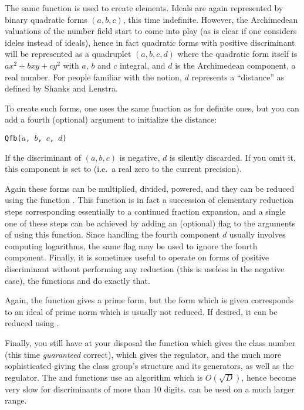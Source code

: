 The same  function is used to create elements. Ideals are again
represented by binary quadratic forms $(a,b,c)$, this time indefinite. However,
the Archimedean valuations of the number field start to come into play (as
is clear if one considers ideles instead of ideals), hence in fact quadratic
forms with positive discriminant will be represented as a quadruplet
$(a,b,c,d)$ where the quadratic form itself is $ax^2+bxy+cy^2$ with $a$,
$b$ and $c$ integral, and $d$ is the Archimedean component, a real number.
For people familiar with the notion, $d$ represents a ``distance'' as defined
by Shanks and Lenstra.

To create such forms, one uses the same function as for definite ones, but
you can add a fourth (optional) argument to initialize the distance:

\centerline{\tt Qfb($a$, $b$, $c$, $d$)}

If the discriminant of $(a,b,c)$ is negative, $d$ is silently
discarded. If you omit it, this component is set to  (i.e.~a real zero
to the current precision).

Again these forms can be multiplied, divided, powered, and they can be
reduced using the function . This function is in fact a
succession of elementary reduction steps corresponding essentially to a
continued fraction expansion, and a single one of these steps can be achieved
by adding an (optional) flag to the arguments of using this function. Since
handling the fourth component $d$ usually involves computing logarithms, the
same flag may be used to ignore the fourth component. Finally, it is
sometimes useful to operate on forms of positive discriminant without
performing any reduction (this is useless in the negative case), the
functions  and  do exactly that.

Again, the function  gives a prime form, but the form which
is given corresponds to an ideal of prime norm which is usually not reduced.
If desired, it can be reduced using .

Finally, you still have at your disposal the function  which
gives the class number (this time {\it guaranteed\/} correct),
 which gives the regulator, and the much more sophisticated
 giving the class group's structure and its generators,
as well as the regulator. The  and 
functions use an algorithm which is $O(\sqrt D)$, hence become very slow for
discriminants of more than 10 digits.  can be used on a
much larger range.

